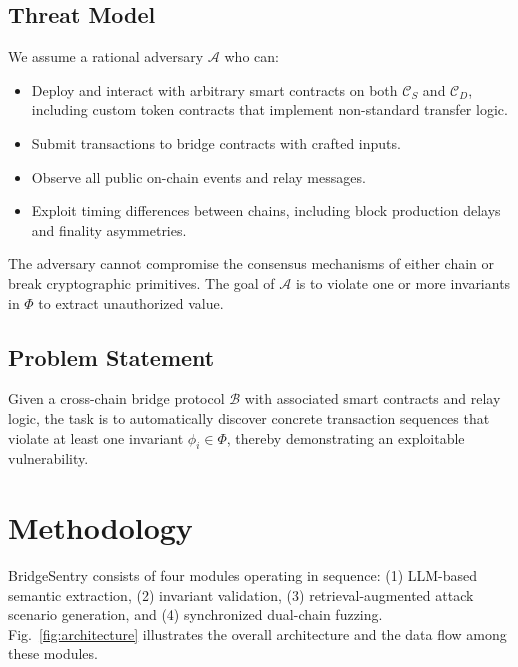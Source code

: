 \documentclass[journal]{IEEEtran}
\begin{document}
\subsection{Threat Model}

We assume a rational adversary $\mathcal{A}$ who can:
\begin{itemize}
    \item Deploy and interact with arbitrary smart contracts on both $\mathcal{C}_S$ and $\mathcal{C}_D$, including custom token contracts that implement non-standard transfer logic.
    \item Submit transactions to bridge contracts with crafted inputs.
    \item Observe all public on-chain events and relay messages.
    \item Exploit timing differences between chains, including block production delays and finality asymmetries.
\end{itemize}

The adversary cannot compromise the consensus mechanisms of either chain or break cryptographic primitives. The goal of $\mathcal{A}$ is to violate one or more invariants in $\Phi$ to extract unauthorized value.

\subsection{Problem Statement}

Given a cross-chain bridge protocol $\mathcal{B}$ with associated smart contracts and relay logic, the task is to automatically discover concrete transaction sequences that violate at least one invariant $\phi_i \in \Phi$, thereby demonstrating an exploitable vulnerability.

\section{Methodology}\label{sec:method}

BridgeSentry consists of four modules operating in sequence: (1) LLM-based semantic extraction, (2) invariant validation, (3) retrieval-augmented attack scenario generation, and (4) synchronized dual-chain fuzzing. Fig.~\ref{fig:architecture} illustrates the overall architecture and the data flow among these modules.
\end{document}
